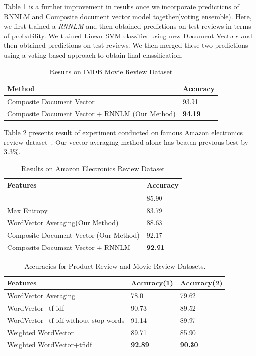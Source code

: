 \documentclass[11pt,a4paper]{article}
\begin{document}
Table \ref{table:IMDB_rnnlm} is a further improvement in results once we incorporate predictions of RNNLM and Composite document vector model together(voting ensemble). Here, we first trained a \emph{RNNLM} and then obtained predictions on test reviews in terms of probability. We trained Linear SVM classifier using new Document Vectors and then obtained predictions on test reviews. We then merged these two predictions using a voting based approach to obtain final classification.

\begin {table}[H]
\centering
\small
\begin{tabular}{ | p{5.5cm} | p{1.2cm} | }
\hline
\textbf{Method} & \textbf{Accuracy} \\ \hline
Composite Document Vector & 93.91\\ \hline
Composite Document Vector + RNNLM (Our Method) & \textbf{94.19}\\ \hline
\end{tabular}
\caption {Results on IMDB Movie Review Dataset}
\label{table:IMDB_rnnlm}
\end{table}

Table \ref{table:amazon} presents result of experiment conducted on famous Amazon electronics review dataset~\cite{snapnets}. Our vector averaging method alone has beaten previous best by 3.3\%.
\begin {table}[H]
\centering
\small
\begin{tabular}{ | p{5.5cm} | p{1.2cm} | }
\hline
\textbf{Features} & \textbf{Accuracy} \\ \hline
\cite{Dredze:08} & 85.90\\ \hline
Max Entropy~\cite{Dredze:08} & 83.79\\ \hline
WordVector Averaging(Our Method) & 88.63\\ \hline
Composite Document Vector (Our Method) & 92.17\\ \hline
Composite Document Vector + RNNLM & \textbf{92.91}\\ \hline
\end{tabular}
\caption {Results on Amazon Electronics Review Dataset}
\label{table:amazon}
\end{table}

\begin {table}[h!]
\centering
\small
\begin{tabular}{ | p{3.6cm} | p{1.5cm} | p{1.5cm} | }
\hline
\textbf{Features} & \textbf{Accuracy(1)} & \textbf{Accuracy(2)} \\ \hline
WordVector Averaging & 78.0 & 79.62\\ \hline
WordVector+tf-idf & 90.73 & 89.52\\ \hline
WordVector+tf-idf without stop words & 91.14 & 89.97\\ \hline
Weighted WordVector & 89.71 & 85.90\\ \hline
Weighted WordVector+tfidf & \textbf{92.89} & \textbf{90.30}\\ \hline
\end{tabular}
\caption {Accuracies for Product Review and Movie Review Datasets.}
\label{table:hindi_ourmethods}
\end{table}
\end{document}

